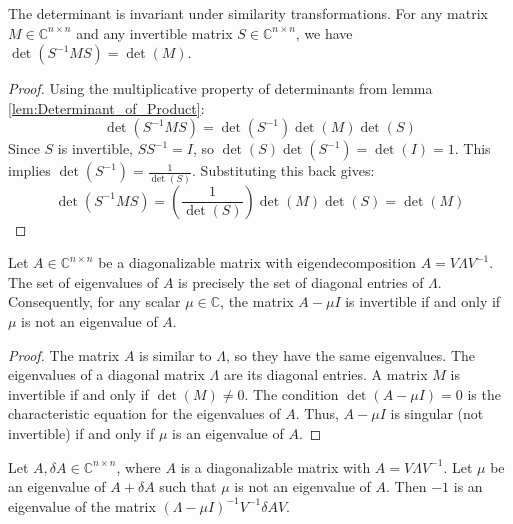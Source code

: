 \begin{lemma}
    \label{lem:Similarity_Invariance_of_Determinant}
    The determinant is invariant under similarity transformations. For any matrix $M \in \mathbb{C}^{n \times n}$ and any invertible matrix $S \in \mathbb{C}^{n \times n}$, we have $\det(S^{-1}MS) = \det(M)$.
\end{lemma}

\begin{proof}
    Using the multiplicative property of determinants from lemma \ref{lem:Determinant_of_Product}:
    \[ \det(S^{-1}MS) = \det(S^{-1}) \det(M) \det(S) \]
    Since $S$ is invertible, $SS^{-1}=I$, so $\det(S)\det(S^{-1})=\det(I)=1$. This implies $\det(S^{-1}) = \frac{1}{\det(S)}$.
    Substituting this back gives:
    \[ \det(S^{-1}MS) = \left(\frac{1}{\det(S)}\right) \det(M) \det(S) = \det(M) \]
\end{proof}

\begin{lemma}
    \label{lem:Eigenvalues_and_Invertibility}
    Let $A \in \mathbb{C}^{n \times n}$ be a diagonalizable matrix with eigendecomposition $A=V\Lambda V^{-1}$. The set of eigenvalues of $A$ is precisely the set of diagonal entries of $\Lambda$. Consequently, for any scalar $\mu \in \mathbb{C}$, the matrix $A - \mu I$ is invertible if and only if $\mu$ is not an eigenvalue of $A$.
\end{lemma}

\begin{proof}
    The matrix $A$ is similar to $\Lambda$, so they have the same eigenvalues. The eigenvalues of a diagonal matrix $\Lambda$ are its diagonal entries.
    A matrix $M$ is invertible if and only if $\det(M) \neq 0$. The condition $\det(A - \mu I) = 0$ is the characteristic equation for the eigenvalues of $A$. Thus, $A - \mu I$ is singular (not invertible) if and only if $\mu$ is an eigenvalue of $A$.
\end{proof}

\begin{lemma}
    \label{lem:Eigenvalue_Perturbation_Identity}
    Let $A, \delta A \in \mathbb{C}^{n \times n}$, where $A$ is a diagonalizable matrix with $A = V\Lambda V^{-1}$. Let $\mu$ be an eigenvalue of $A + \delta A$ such that $\mu$ is not an eigenvalue of $A$. Then $-1$ is an eigenvalue of the matrix $(\Lambda - \mu I)^{-1} V^{-1} \delta A V$.
\end{lemma}

